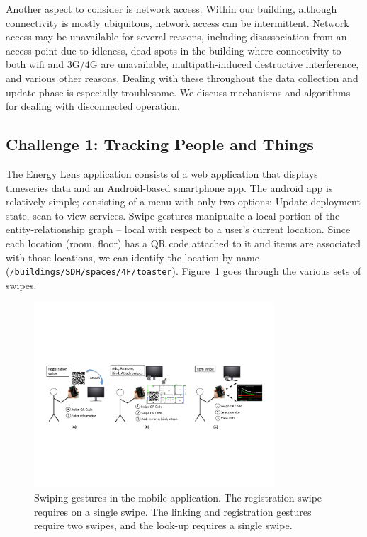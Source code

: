 Another aspect to consider is network access.  Within our building, although connectivity is mostly ubiquitous, network
access can be intermittent.  Network access may be unavailable for several reasons, including disassociation from an access point due
to idleness, dead spots in the building where connectivity to both wifi and 3G/4G are unavailable, multipath-induced
destructive interference, and various other reasons.  Dealing with these throughout the data collection and update phase is
especially troublesome.  We discuss mechanisms and algorithms for dealing with disconnected operation.


\subsection{Challenge 1: Tracking People and Things}
\label{sec:tracking}

The Energy Lens application consists of a web application that displays timeseries data and an Android-based smartphone
app.
The android app is relatively simple; consisting of a menu with only two options: Update deployment state, scan to view services.
Swipe gestures manipualte a local portion of the entity-relationship graph -- local with respect to a user's current location.
Since each location (room, floor) has a QR code attached to it and items are associated with those locations, we
can identify the location by name (\texttt{/buildings/SDH/spaces/4F/toaster}).  
Figure~\ref{fig:swipes} goes through the various sets 
of swipes.

\begin{figure}[htb!]
\begin{center}
\includegraphics[width=0.8\textwidth]{figs/swipes}
\caption{Swiping gestures in the mobile application.  The registration swipe requires on a single swipe.  The 
linking and registration gestures require two swipes, and the look-up requires a single swipe.}
\label{fig:swipes}
\end{center}
\end{figure}

